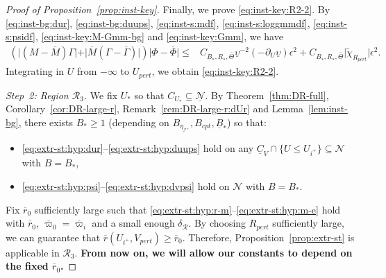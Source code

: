 \documentclass[10pt, reqno]{amsart}
\theoremstyle{definition}
\theoremstyle{remark}
\theoremstyle{conjecture}
\numberwithin{equation}{section}
\newcommand{\abs}[1]{\vert#1\vert}
\newcommand{\set}[1]{\{#1\}}
\newcommand{\rd}{\partial}
\newcommand{\0}{\emptyset}
\newcommand{\Gmm}{\Gamma}
\newcommand{\dlt}{\delta}
\newcommand{\eps}{\epsilon}
\newcommand{\Tht}{\Theta}
\newcommand{\ups}{\upsilon}
\newcommand{\calI}{\mathcal I}
\newcommand{\calN}{\mathcal N}
\newcommand{\calR}{\mathcal R}
\newcommand{\uC}{\underline{C}}
\newcommand{\pfstep}[1]{\vspace{.5em} {\it \noindent #1.}}
\newcommand{\NI}{\calI^{+}}						%
\newcommand{\rbg}{\overline{r}}					%
\newcommand{\varpibg}{\overline{\varpi}}				%
\begin{document}
\begin{proof}[Proof of Proposition~\ref{prop:inst-key}]
Finally, we prove \eqref{eq:inst-key:R2-2}. By \eqref{eq:inst-bg:dur}, \eqref{eq:inst-bg:duups}, \eqref{eq:inst-s:mdf}, \eqref{eq:inst-s:loggmmdf}, \eqref{eq:inst-s:psidf}, \eqref{eq:inst-key:M-Gmm-bg} and \eqref{eq:inst-key:Gmm}, we have
\begin{align*}
	\left(\abs{(M - \overline{M}) \Gmm} + \abs{\overline{M} (\Gmm - \overline{\Gmm})}\right) \abs{\Phi - \overline{\Phi}}
	\leq & C_{\underline{B}_{\ast},\underline{R}_*, \overline{\Tht}} \underline{\ups}^{-2} (-\rd_{U} \underline{\ups}) \eps^{2} + C_{\underline{B}_{\ast},\underline{R}_*, \overline{\Tht}} \abs{\tilde{\chi}_{R_{pert}}} \eps^{2}.
\end{align*}
Integrating in $U$ from $-\infty$ to $U_{pert}$, we obtain \eqref{eq:inst-key:R2-2}.

\pfstep{Step~2: Region $\calR_{3}$}
We fix $U_{\ast}$ so that $C_{U_{\ast}} \subseteq \underline{\calN}$. 
By Theorem~\ref{thm:DR-full}, Corollary~\ref{cor:DR-large-r}, Remark~\ref{rem:DR-large-r:dUr} and Lemma~\ref{lem:inst-bg}, there exists $B_{\ast} \geq 1$ (depending on $B_{\eta_{\NI}}, B_{cpt}, \underline{B}_{\ast}$) so that:
\begin{itemize}
\item \eqref{eq:extr-st:hyp:dur}--\eqref{eq:extr-st:hyp:duups} hold on any $\uC_{V} \cap \set{U \leq U_{i^{+}}} \subseteq \calN$ with $B = B_{\ast}$,
\item \eqref{eq:extr-st:hyp:psi}--\eqref{eq:extr-st:hyp:dvpsi} hold on $\calN$ with $B = B_{\ast}$.
\end{itemize}
Fix $\rbg_{0}$ sufficiently large such that \eqref{eq:extr-st:hyp:r-m}--\eqref{eq:extr-st:hyp:m-e} hold with $\rbg_{0}$, $\varpibg_{0} = \varpibg_{i}$ and a small enough $\dlt_{\calR}$. By choosing $R_{pert}$ sufficiently large, we can guarantee that $\rbg(U_{i^{+}}, V_{pert})\geq \rbg_{0}$. Therefore, Proposition~\ref{prop:extr-st} is applicable in $\calR_{3}$. \textbf{From now on, we will allow our constants to depend on the fixed $\rbg_{0}$.}


\end{proof}
\end{document}
